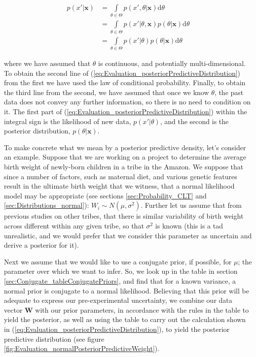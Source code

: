 \documentclass[11pt,fullpage]{book}
\begin{document}
\begin{equation}\label{eq:Evaluation_posteriorPredictiveDistribution}
\begin{align}
p(x'|\boldsymbol{x}) &= \int\limits_{\theta\in\Theta} p(x',\theta|\boldsymbol{x}) \mathrm{d}\theta\\
&= \int\limits_{\theta\in\Theta} p(x'|\theta,\boldsymbol{x}) p(\theta|\boldsymbol{x}) \mathrm{d}\theta\\
&= \int\limits_{\theta\in\Theta} p(x'|\theta) p(\theta|\boldsymbol{x}) \mathrm{d}\theta
\end{align}
\end{equation}

where we have assumed that $\theta$ is continuous, and potentially multi-dimensional. To obtain the second line of (\ref{eq:Evaluation_posteriorPredictiveDistribution}) from the first we have used the law of conditional probability. Finally, to obtain the third line from the second, we have assumed that once we know $\theta$, the past data does not convey any further information, so there is no need to condition on it. The first part of (\ref{eq:Evaluation_posteriorPredictiveDistribution}) within the integral sign is the likelihood of new data, $p(x'|\theta)$, and the second is the posterior distribution, $p(\theta|\boldsymbol{x})$. 

To make concrete what we mean by a posterior predictive density, let's consider an example. Suppose that we are working on a project to determine the average birth weight of newly-born children in a tribe in the Amazon. We suppose that since a number of factors, such as maternal diet, and various genetic features result in the ultimate birth weight that we witness, that a normal likelihood model may be appropriate (see sections \ref{sec:Probability_CLT} and \ref{sec:Distributions_normal}): $W_i\sim N(\mu,\sigma^2)$. Further let us assume that from previous studies on other tribes, that there is similar variability of birth weight across different within any given tribe, so that $\sigma^2$ is known (this is a tad unrealistic, and we would prefer that we consider this parameter as uncertain and derive a posterior for it). 

Next we assume that we would like to use a conjugate prior, if possible, for $\mu$; the parameter over which we want to infer. So, we look up in the table in section \ref{sec:Conjugate_tableConjugatePriors}, and find that for a known variance, a normal prior is conjugate to a normal likelihood. Believing that this prior will be adequate to express our pre-experimental uncertainty, we combine our data vector $\boldsymbol{W}$ with our prior parameters, in accordance with the rules in the table to yield the posterior, as well as using the table to carry out the calculation shown in (\ref{eq:Evaluation_posteriorPredictiveDistribution}), to yield the posterior predictive distribution (see figure \ref{fig:Evaluation_normalPosteriorPredictiveWeight}).
\end{document}

